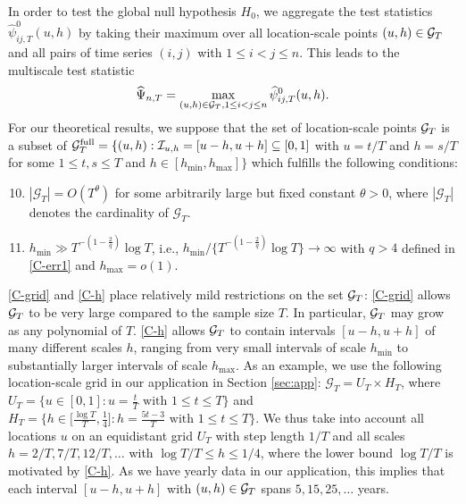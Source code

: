 \documentclass[12pt]{article}
\begin{document}
In order to test the global null hypothesis $H_0$, we aggregate the test statistics $\widehat{\psi}^0_{ij, T}(u, h)$ by taking their maximum over all location-scale points $(u,h) \in \mathcal{G}_T$ and all pairs of time series $(i,j)$ with $1 \le i < j \le n$. This leads to the multiscale test statistic 
\[ \widehat{\Psi}_{n,T} = \max_{(u,h) \in \mathcal{G}_T, 1 \le i < j \le n} \widehat{\psi}^0_{ij, T}(u, h). \]
For our theoretical results, we suppose that the set of location-scale points $\mathcal{G}_T$ is a subset of $\mathcal{G}_T^{\text{full}} = \{ (u, h): \mathcal{I}_{u, h} = [u-h,u+h] \subseteq [0,1]$ with $u = t/T$ and $h = s/T$  for some $1 \le t, s \le T$ and $h \in [h_{\min},h_{\max}] \}$ which fulfills the following conditions:
\begin{enumerate}[label=(C\arabic*),leftmargin=1.2cm, itemsep=0pt, parsep=0pt, topsep=3pt]
\setcounter{enumi}{9}

\item \label{C-grid} $|\mathcal{G}_T| = O(T^\theta)$ for some arbitrarily large but fixed constant $\theta > 0$, where $|\mathcal{G}_T|$ denotes the cardinality of $\mathcal{G}_T$. 

\item \label{C-h} $h_{\min} \gg T^{-(1-\frac{2}{q})} \log T$, i.e., $h_{\min} / \{ T^{-(1-\frac{2}{q})} \log T \} \rightarrow \infty$ with $q > 4$ defined in \ref{C-err1} and $h_{\max} = o(1)$.

\end{enumerate}
\ref{C-grid} and \ref{C-h} place relatively mild restrictions on the set $\mathcal{G}_T$: \ref{C-grid} allows $\mathcal{G}_T$ to be very large compared to the sample size $T$. In particular, $\mathcal{G}_T$ may grow as any polynomial of $T$. \ref{C-h} allows $\mathcal{G}_T$ to contain intervals $[u-h,u+h]$ of many different scales $h$, ranging from very small intervals of scale $h_{\min}$ to substantially larger intervals of scale $h_{\max}$.
As an example, we use the following location-scale grid in our application in Section \ref{sec:app}: $\mathcal{G}_T = U_T \times H_T$, where $U_T = \big\{ u \in [0,1]: u = \textstyle{\frac{t}{T}} \text{ with } 1 \le t \le T \big\}$ and $H_T = \big\{ h \in \big[ \textstyle{\frac{\log T}{T}}, \textstyle{\frac{1}{4}} \big]:  h = \textstyle{\frac{5t - 3}{T}} \text{ with } 1 \le t \le T \big\}$. We thus take into account all locations $u$ on an equidistant grid $U_T$ with step length $1/T$ and all scales $h=2/T, 7/T, 12/T,\ldots$ with $\log T /T \le h \le 1/4$, where the lower bound $\log T / T$ is motivated by \ref{C-h}. As we have yearly data in our application, this implies that each interval $[u-h,u+h]$ with $(u,h) \in \mathcal{G}_T$ spans $5, 15, 25, \ldots$ years. 
\end{document}
